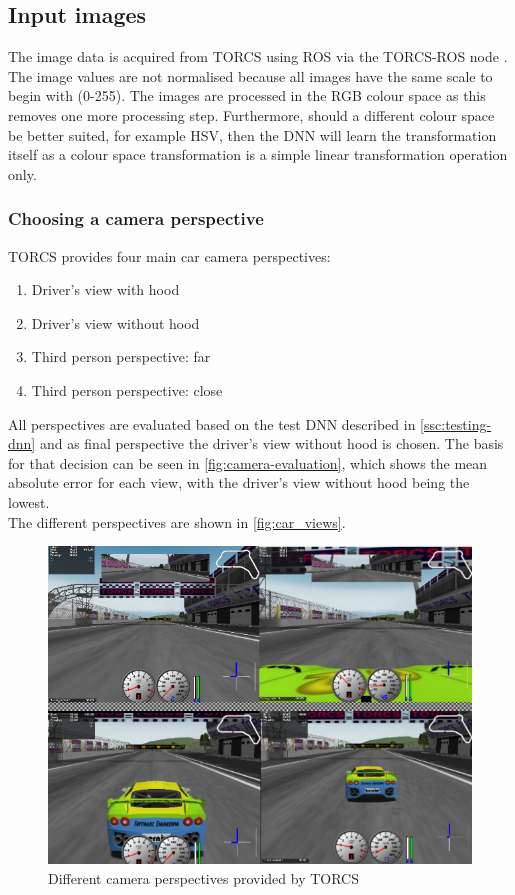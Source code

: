 \documentclass[10pt,a4paper,twoside,journal]{IEEEtran}
\begin{document}
\subsection{Input images}
\label{ssc:input-images}
The image data is acquired from TORCS \cite{TORCS} using ROS via the TORCS-ROS node \cite{mirus_torcs-ros_2017}. The image values are not normalised because all images have the same scale to begin with (0-255). The images are processed in the RGB colour space as this removes one more processing step. Furthermore, should a different colour space be better suited, for example HSV, then the DNN will learn the transformation itself as a colour space transformation is a simple linear transformation operation only. 

\subsubsection{Choosing a camera perspective}
TORCS provides four main car camera perspectives: 
\begin{enumerate}
	\item Driver's view with hood
	\item Driver's view without hood
	\item Third person perspective: far
	\item Third person perspective: close
\end{enumerate}
All perspectives are evaluated based on the test DNN described in \autoref{ssc:testing-dnn} 
and as final perspective the driver's view without hood is chosen. The basis for that decision can be seen in 
\autoref{fig:camera-evaluation}, which shows the mean absolute error for each view, with the driver's view without hood being the lowest.\\ 
The different perspectives are shown in \autoref{fig:car_views}.
\begin{figure}[ht]
	\centering
	\includegraphics[width=\columnwidth]{attachments/car_view_compilation.png}
	\caption{Different camera perspectives provided by TORCS}
	\label{fig:car_views}
\end{figure}
\end{document}

